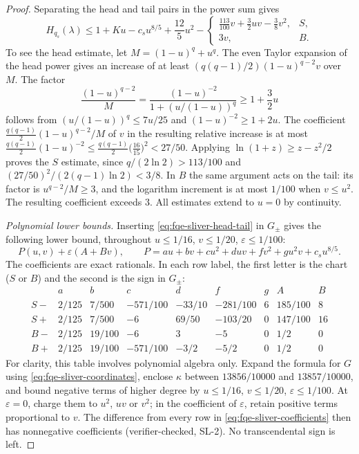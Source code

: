 \begin{proof}
Separating the head and tail pairs in the power sum gives
\[
H_{q_s}(\lambda)\le1+Ku-c_su^{8/5}+\frac{12}5u^2
-\begin{cases}
\frac{113}{100}v+\frac32uv-\frac38v^2,&S,\\
3v,&B.
\end{cases}
\tag{SH}\label{eq:fqe-sliver-head-tail}
\]
To see the head estimate, let $M=(1-u)^q+u^q$.
The even Taylor expansion of the head power gives an increase of at least
$(q(q-1)/2)(1-u)^{q-2}v$ over $M$. The factor
\[
\frac{(1-u)^{q-2}}M
=\frac{(1-u)^{-2}}{1+(u/(1-u))^q}\ge1+\frac32u
\]
follows from $(u/(1-u))^q\le7u/25$ and $(1-u)^{-2}\ge1+2u$.
The coefficient $\frac{q(q-1)}2(1-u)^{q-2}/M$ of $v$ in the resulting relative increase is at most
$\frac{q(q-1)}2(1-u)^{-2}\le\frac{q(q-1)}2\bigl(\frac{16}{15}\bigr)^2<27/50$. Applying $\ln(1+z)\ge z-z^2/2$ proves the $S$ estimate,
since $q/(2\ln2)>113/100$ and
$(27/50)^2/(2(q-1)\ln2)<3/8$.
In $B$ the same argument acts on the tail: its factor is
$u^{q-2}/M\ge3$, and the logarithm increment is at most $1/100$
when $v\le u^2$. The resulting coefficient exceeds $3$.
All estimates extend to $u=0$ by continuity.

\emph{Polynomial lower bounds.}
Inserting \eqref{eq:fqe-sliver-head-tail} in $G_{\pm}$
gives the following lower bound, throughout
$u\le1/16$, $v\le1/20$, $\varepsilon\le1/100$:
\[
P(u,v)+\varepsilon(A+Bv),\qquad
P=au+bv+cu^2+duv+fv^2+gu^2v+c_su^{8/5}.
\tag{SP}\label{eq:fqe-sliver-polynomial}
\]
The coefficients are exact rationals. In each row label, the first letter is the chart ($S$ or $B$)
and the second is the sign in $G_\pm$:
\[
\begin{array}{c|rrrrrr|rr}
&a&b&c&d&f&g&A&B\\\hline
S-&2/125&7/500&-571/100&-33/10&-281/100&6&185/100&8\\
S+&2/125&7/500&-6&69/50&-103/20&0&147/100&16\\
B-&2/125&19/100&-6&3&-5&0&1/2&0\\
B+&2/125&19/100&-571/100&-3/2&-5/2&0&1/2&0
\end{array}
\tag{ST}\label{eq:fqe-sliver-coefficients}
\]
For clarity, this table involves polynomial algebra only. Expand the
formula for $G$ using \eqref{eq:fqe-sliver-coordinates}, enclose $\kappa$
between $13856/10000$ and $13857/10000$, and bound negative terms of
higher degree by $u\le1/16$, $v\le1/20$, $\varepsilon\le1/100$.
At $\varepsilon=0$, charge them to $u^2$, $uv$ or $v^2$; in the
coefficient of $\varepsilon$, retain positive terms proportional to $v$.
The difference from every row in \eqref{eq:fqe-sliver-coefficients}
then has nonnegative coefficients (verifier-checked, SL-2). No transcendental sign is left.


\end{proof}
